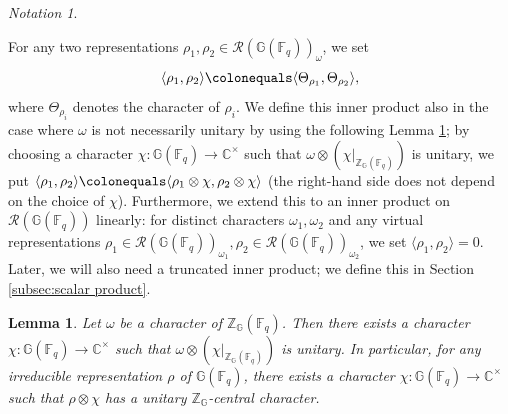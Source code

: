 \documentclass{amsart}
\newcommand{\F}{\mathbb{F}}
\newcommand{\FF}{\mathbb{F}}
\newcommand{\C}{\mathbb{C}}
\newcommand{\bbG}{\mathbb{G}}
\newcommand{\bbZ}{\mathbb{Z}}
\newcommand{\cR}{\mathcal{R}}
\theoremstyle{plain}
\newtheorem{lem}[thm]{Lemma}
\theoremstyle{definition}
\theoremstyle{remark}
\newtheorem{notation}[thm]{Notation}
\theoremstyle{theorem}
\begin{document}
\begin{notation}
\begin{enumerate}[label=(\alph*)]
        For any two representations $\rho_1, \rho_2 \in \cR(\bbG(\FF_q))_\omega$, we set 
        \begin{equation*}
            \langle \rho_1, \rho_2 \rangle \colonequals \langle \Theta_{\rho_1}, \Theta_{\rho_2} \rangle,
        \end{equation*}
        where $\Theta_{\rho_i}$ denotes the character of $\rho_i$.
        We define this inner product also in the case where $\omega$ is not necessarily unitary by using the following Lemma \ref{lem:twist}; by choosing a character $\chi\colon\bbG(\F_{q})\rightarrow\C^{\times}$ such that $\omega\otimes(\chi|_{\bbZ_{\bbG}(\F_{q})})$ is unitary, we put $\langle \rho_1, \rho_2 \rangle \colonequals \langle \rho_{1}\otimes\chi,\rho_{2}\otimes\chi\rangle$ (the right-hand side does not depend on the choice of $\chi$).
        Furthermore, we extend this to an inner product on $\cR(\bbG(\FF_q))$ linearly: for distinct characters $\omega_1, \omega_2$ and any virtual representations $\rho_1 \in \cR(\bbG(\FF_q))_{\omega_1}, \rho_2 \in \cR(\bbG(\FF_q))_{\omega_2}$, we set $\langle \rho_1, \rho_2 \rangle = 0$.
        Later, we will also need a truncated inner product; we define this in Section \ref{subsec:scalar product}.
    \end{enumerate}
\end{notation}


\begin{lem}\label{lem:twist}
Let $\omega$ be a character of $\bbZ_{\bbG}(\F_{q})$.
Then there exists a character $\chi\colon\bbG(\F_{q})\rightarrow\C^{\times}$ such that $\omega\otimes(\chi|_{\bbZ_{\bbG}(\F_{q})})$ is unitary.
In particular, for any irreducible representation $\rho$ of $\bbG(\F_{q})$, there exists a character $\chi\colon\bbG(\F_{q})\rightarrow\C^{\times}$ such that $\rho\otimes\chi$ has a unitary $\bbZ_{\bbG}$-central character.
\end{lem}
\end{document}
